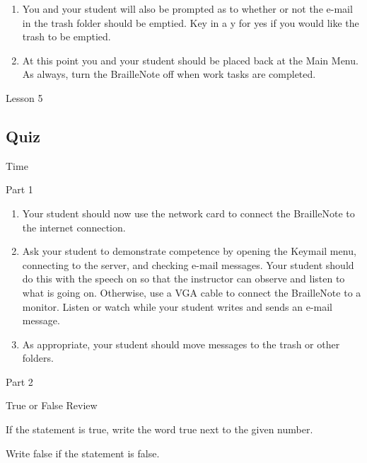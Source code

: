 \documentclass[10pt,letterpaper,twoside]{report}
\begin{document}
{{{{\begin{enumerate}
	\item You and your student will also be prompted as to whether or not the e-mail in the trash folder should be emptied.  Key in a y for yes if you would like the trash to be emptied.
	      
	\item At this point you and your student should be placed back at the Main Menu.  As always, turn the BrailleNote off when work tasks are completed.
\end{enumerate}





\clearpage

\newpage
Lesson 5

\subsection{Quiz} Time



Part 1



\begin{enumerate}
	\item Your student should now use the network card to connect the BrailleNote to the internet connection.
	      
	      
	      
	\item Ask your student to demonstrate competence by opening the Keymail menu, connecting to the server, and checking e-mail messages.  Your student should do this with the speech on so that the instructor can observe and listen to what is going on.  Otherwise, use a VGA cable to connect the BrailleNote to a monitor. Listen or watch while your student writes and sends an e-mail message.
	      
	      
	      
	\item As appropriate, your student should move messages to the trash or other folders.
\end{enumerate}



Part 2

True or False Review



If the statement is true, write the word true next to the given number.

Write false if the statement is false.



}}}}
\end{document}
